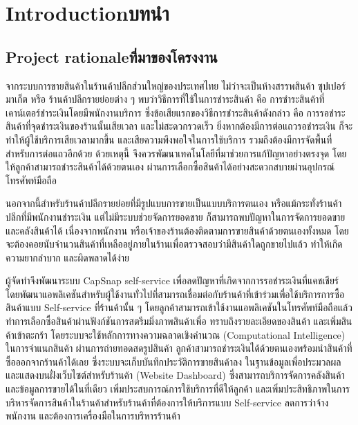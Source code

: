 \chapter{\ifenglish Introduction\else บทนำ\fi}

\section{\ifenglish Project rationale\else ที่มาของโครงงาน\fi}
\par จากระบบการขายสินค้าในร้านค้าปลีกส่วนใหญ่ของประเทศไทย ไม่ว่าจะเป็นห้างสรรพสินค้า ซุปเปอร์มาเก็ต หรือ
ร้านค้าปลีกรายย่อยต่าง ๆ พบว่าวิธีการที่ใช้ในการชำระสินค้า คือ การชำระสินค้าที่เคาน์เตอร์ชำระเงินโดยมีพนักงานบริการ
ซึ่งข้อเสียแรกของวิธีการชำระสินค้าดังกล่าว คือ การรอชำระสินค้าที่จุดชำระเงินของร้านนั้นเสียเวลา และไม่สะดวกรวดเร็ว
ยิ่งหากต้องมีการต่อแถวรอชำระเงิน ก็จะทำให้ผู้ใช้บริการเสียเวลามากขึ้น และเสียความพึงพอใจในการใช้บริการ
รวมถึงต้องมีการจัดพื้นที่สำหรับการต่อแถวอีกด้วย ด้วยเหตุนี้ จึงควรพัฒนาเทคโนโลยีที่มาช่วยการแก้ปัญหาอย่างตรงจุด
โดยให้ลูกค้าสามารถชำระสินค้าได้ด้วยตนเอง ผ่านการเลือกซื้อสินค้าได้อย่างสะดวกสบายผ่านอุปกรณ์โทรศัพท์มือถือ

นอกจากนี้สำหรับร้านค้าปลีกรายย่อยที่มีรูปแบบการขายเป็นแบบบริการตนเอง หรือแม้กระทั่งร้านค้าปลีกที่มีพนักงานชำระเงิน
แต่ไม่มีระบบช่วยจัดการยอดขาย ก็สามารถพบปัญหาในการจัดการยอดขาย และคลังสินค้าได้ เนื่องจากพนักงาน
หรือเจ้าของร้านต้องติดตามการขายสินค้าด้วยตนเองทั้งหมด โดยจะต้องคอยนับจํานวนสินค้าที่เหลืออยู่ภายในร้านเพื่อตรวจสอบว่ามีสินค้าใดถูกขายไปแล้ว 
ทำให้เกิดความยากลำบาก และผิดพลาดได้ง่าย

ผู้จัดทําจึงพัฒนาระบบ CapSnap self-service เพื่อลดปัญหาที่เกิดจากการรอชำระเงินที่แคชเชียร์
โดยพัฒนาแอพลิเคชันสำหรับผู้ใช้งานทั่วไปที่สามารถเชื่อมต่อกับร้านค้าที่เข้าร่วมเพื่อใช้บริการการซื้อสินค้าแบบ Self-service
ที่ร้านค้านั้น ๆ โดยลูกค้าสามารถเข้าใช้งานแอพลิเคชันในโทรศัพท์มือถือแล้วทำการเลือกซื้อสินค้าผ่านฟังก์ชันการสตรีมมิ่งภาพสินค้าเพื่อ
ทราบถึงรายละเอียดของสินค้า และเพิ่มสินค้าเข้าตะกร้า โดยระบบจะใช้หลักการทางความฉลาดเชิงคำนวณ (Computational Intelligence) ในการจำแนกสินค้า
ผ่านการถ่ายทอดสดรูปสินค้า ลูกค้าสามารถชำระเงินได้ด้วยตนเองพร้อมนำสินค้าที่ซื้อออกจากร้านค้าได้เลย ซึ่งระบบจะเก็บบันทึกประวัติการขายสินค้าลง
ในฐานข้อมูลเพื่อประมวลผล และแสดงบนฝั่งเว็บไซต์สำหรับร้านค้า (Website Dashboard) ซึ่งสามารถบริการจัดการคลังสินค้า และข้อมูลการขายได้ในที่เดียว
เพิ่มประสบการณ์การใช้บริการที่ดีให้ลูกค้า และเพิ่มประสิทธิภาพในการบริหารจัดการสินค้าในร้านค้าสำหรับร้านค้าที่ต้องการให้บริการแบบ
Self-service ลดการว่าจ้างพนักงาน และต้องการเครื่องมือในการบริหารร้านค้า



